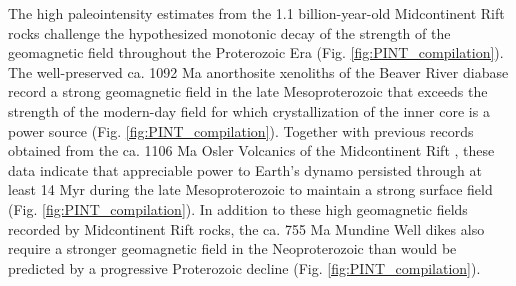 \documentclass[9pt,twocolumn,twoside,lineno]{pnas-new}
\begin{document}
The high paleointensity estimates from the 1.1 billion-year-old Midcontinent Rift rocks challenge the hypothesized monotonic decay of the strength of the geomagnetic field throughout the Proterozoic Era (Fig. \ref{fig:PINT_compilation}). The well-preserved ca. 1092 Ma anorthosite xenoliths of the Beaver River diabase record a strong geomagnetic field in the late Mesoproterozoic that exceeds the strength of the modern-day field for which crystallization of the inner core is a power source (Fig. \ref{fig:PINT_compilation}). Together with previous records obtained from the ca. 1106 Ma Osler Volcanics of the Midcontinent Rift \cite{Sprain2018a}, these data indicate that appreciable power to Earth's dynamo persisted through at least 14 Myr during the late Mesoproterozoic to maintain a strong surface field (Fig. \ref{fig:PINT_compilation}). In addition to these high geomagnetic fields recorded by Midcontinent Rift rocks, the ca. 755 Ma Mundine Well dikes \cite{Lloyd2021b} also require a stronger geomagnetic field in the Neoproterozoic than would be predicted by a progressive Proterozoic decline (Fig. \ref{fig:PINT_compilation}). 
\end{document}
